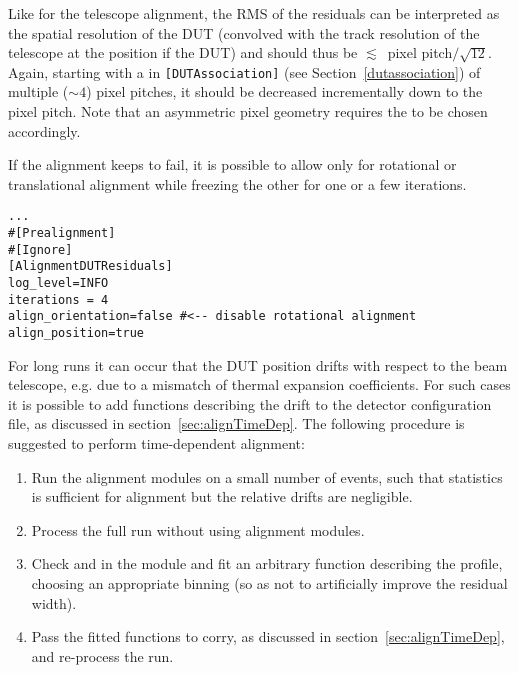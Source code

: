 Like for the telescope alignment, the RMS of the residuals can be interpreted as the spatial resolution of the DUT (convolved with the track resolution of the telescope at the position if the DUT) and should thus be $\lesssim$~pixel pitch$/\sqrt{12}$.
Again, starting with a  in \texttt{[DUTAssociation]} (see Section~\ref{dutassociation}) of multiple ($\sim4$) pixel pitches, it should be decreased incrementally down to the pixel pitch. Note that an asymmetric pixel geometry requires the  to be chosen accordingly.

If the alignment keeps to fail, it is possible to allow only for rotational or translational alignment while freezing the other for one or a few iterations.

\begin{verbatim}
...
#[Prealignment]
#[Ignore]
[AlignmentDUTResiduals]
log_level=INFO
iterations = 4
align_orientation=false #<-- disable rotational alignment
align_position=true
\end{verbatim}

For long runs it can occur that the DUT position drifts with respect to the beam telescope, e.g. due to a mismatch of thermal expansion coefficients. For such cases it is possible to add functions describing the drift to the detector configuration file, as discussed in section~\ref{sec:alignTimeDep}. The following procedure is suggested to perform time-dependent alignment:
\begin{enumerate}
\item Run the alignment modules on a small number of events, such that statistics is sufficient for alignment but the relative drifts are negligible.
\item Process the full run without using alignment modules.
\item Check  and  in the \command{[AnalysisDUT]} module and fit an arbitrary function describing the profile, choosing an appropriate binning (so as not to artificially improve the residual width).
\item Pass the fitted functions to corry, as discussed in section~\ref{sec:alignTimeDep}, and re-process the run.
\end{enumerate}
